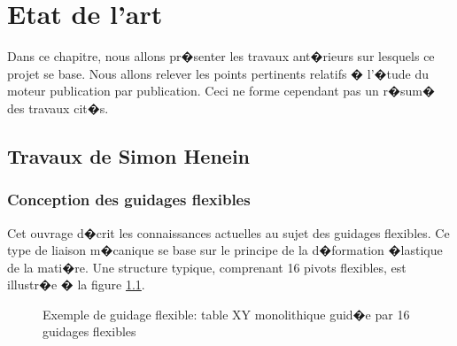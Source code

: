 \chapter{Etat de l'art}
\label{etat_art}

Dans ce chapitre, nous allons pr�senter les travaux ant�rieurs sur lesquels ce projet se base. Nous allons relever les points pertinents relatifs � l'�tude du moteur publication par publication. Ceci ne forme cependant pas un r�sum� des travaux cit�s.

\thispagestyle{empty}

\section{Travaux de Simon Henein}
\subsection{Conception des guidages flexibles}


Cet ouvrage d�crit les connaissances actuelles au sujet des guidages flexibles. Ce type de liaison m�canique se base sur le principe de la d�formation �lastique de la mati�re. Une structure typique, comprenant 16 pivots flexibles, est illustr�e � la figure \ref{fig: image_pivot_fex}. 

\begin{figure}[!ht]
\centering
\caption{Exemple de guidage flexible: table XY monolithique guid�e par 16 guidages flexibles}
\label{fig: image_pivot_fex}
\end{figure}

\newpage

